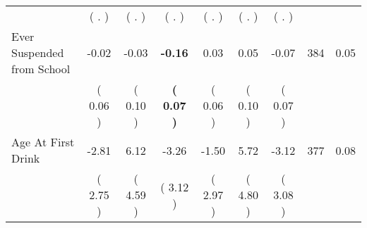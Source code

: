 \begin{tabular}{lcccccccc}
 & (        . ) & (        . ) & (        . ) & (        . ) & (        . ) & (        . ) & \\
Ever Suspended from School &     -0.02 &     -0.03 & \textbf{    -0.16} &      0.03 &      0.05 &     -0.07 & 384 &       0.05 \\ 
 & (     0.06 ) & (     0.10 ) & \textbf{(     0.07 )} & (     0.06 ) & (     0.10 ) & (     0.07 ) & \\
Age At First Drink &     -2.81 &      6.12 &     -3.26 &     -1.50 &      5.72 &     -3.12 & 377 &       0.08 \\ 
 & (     2.75 ) & (     4.59 ) & (     3.12 ) & (     2.97 ) & (     4.80 ) & (     3.08 ) & \\
\bottomrule
\end{tabular}
